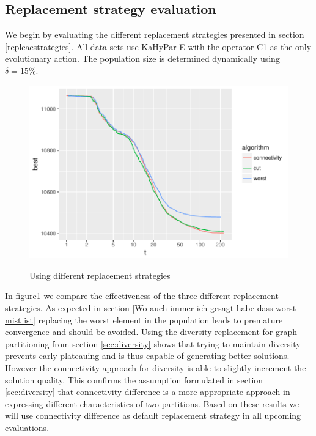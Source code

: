 \documentclass[a4paper,12pt,titlepage, BCOR7mm,headsepline]{scrbook}
\numberwithin{equation}{section}
\begin{document}
\subsection{Replacement strategy evaluation}
We begin by evaluating the different replacement strategies presented in section \ref{replcaestrategies}. All data sets use KaHyPar-E with the operator C1 as the only evolutionary action. The population size is determined dynamically using $\delta = 15\%$. 
\begin{figure}[H]
\caption{Using different replacement strategies}

\begin{center}
\includegraphics{bachelorarbeit-replacestrategies}\label{fig:replacement}
\end{center}

\end{figure}
In figure\ref{fig:replacement} we compare the effectiveness of the three different replacement strategies. As expected in section \ref{Wo auch immer ich gesagt habe dass worst mist ist} replacing the worst element in the population leads to premature convergence and should be avoided. Using the diversity replacement for graph partitioning \cite{sanders2012distributed} from section \ref{sec:diversity} shows that trying to maintain diversity prevents early plateauing and is thus capable of generating better solutions. However the connectivity approach for diversity is able to slightly increment the solution quality. This comfirms the assumption formulated in section \ref{sec:diversity} that connectivity difference is a more appropriate approach in expressing different characteristics of two partitions. Based on these results we will use connectivity difference as default replacement strategy in all upcoming evaluations.
\end{document}
